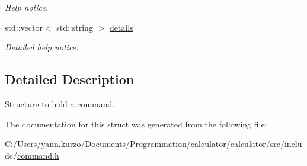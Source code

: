 \begin{DoxyCompactItemize}
\begin{DoxyCompactList}\small\item\em Help notice. \end{DoxyCompactList}\item 
\hypertarget{structcommand__t_a25db510f456264dc73b0887fca10575f}{}std\+::vector$<$ std\+::string $>$ \hyperlink{structcommand__t_a25db510f456264dc73b0887fca10575f}{details}\label{structcommand__t_a25db510f456264dc73b0887fca10575f}

\begin{DoxyCompactList}\small\item\em Detailed help notice. \end{DoxyCompactList}\end{DoxyCompactItemize}


\subsection{Detailed Description}
Structure to hold a command. 

The documentation for this struct was generated from the following file\+:\begin{DoxyCompactItemize}
\item 
C\+:/\+Users/yann.\+kurzo/\+Documents/\+Programmation/calculator/calculator/src/include/\hyperlink{command_8h}{command.\+h}\end{DoxyCompactItemize}

